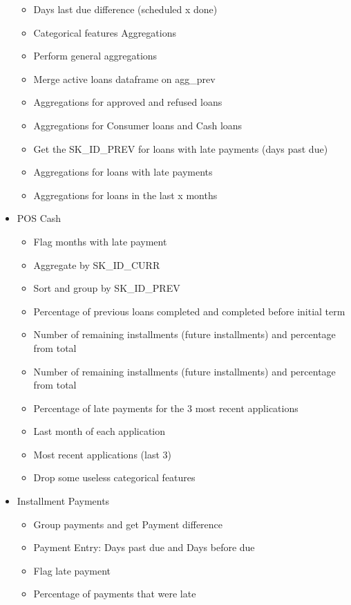 \documentclass[twoside,a4paper]{article}
\begin{document}
\begin{itemize}
\begin{itemize}
        \item Days last due difference (scheduled x done)
        \item Categorical features Aggregations
        \item Perform general aggregations
        \item Merge active loans dataframe on agg\_prev
        \item Aggregations for approved and refused loans
        \item Aggregations for Consumer loans and Cash loans
        \item Get the SK\_ID\_PREV for loans with late payments (days past due)
        \item Aggregations for loans with late payments
        \item Aggregations for loans in the last x months
    \end{itemize}
    \item POS Cash
    \begin{itemize}
        \item Flag months with late payment
        \item Aggregate by SK\_ID\_CURR
        \item Sort and group by SK\_ID\_PREV
        \item Percentage of previous loans completed and completed before initial term
        \item Number of remaining installments (future installments) and percentage from total
        \item Number of remaining installments (future installments) and percentage from total
        \item Percentage of late payments for the 3 most recent applications
        \item Last month of each application
        \item Most recent applications (last 3)
        \item Drop some useless categorical features
    \end{itemize}
    \item Installment Payments
    \begin{itemize}
        \item Group payments and get Payment difference
        \item Payment Entry: Days past due and Days before due
        \item Flag late payment
        \item Percentage of payments that were late

\end{itemize}
\end{itemize}
\end{document}

